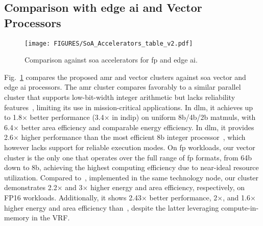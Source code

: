 \subsection{Comparison with edge \gls{ai} and Vector Processors}
\label{sec:soa-acc}
\begin{figure}[t]
    \centering
    \texttt{[image: FIGURES/SoA\_Accelerators\_table\_v2.pdf]}
    \caption{Comparison against \gls{soa} accelerators for \gls{fp} and edge \gls{ai}.}
    \label{fig:soa-accelerators}
\end{figure}

Fig.~\ref{fig:soa-accelerators} compares the proposed \gls{amr} and vector clusters against \gls{soa} vector and edge \gls{ai} processors. The \gls{amr} cluster compares favorably to a similar parallel cluster that supports low-bit-width integer arithmetic but lacks reliability features~\cite{valenteHeterogeneousRISCVBased2024}, limiting its use in mission-critical applications. In \gls{dlm}, it achieves up to 1.8$\times$ better performance (3.4$\times$ in \gls{indip}) on uniform 8b/4b/2b \glspl{matmul}, with  6.4$\times$ better area efficiency and comparable energy efficiency. In \gls{dlm}, it provides 2.6$\times$ higher performance than the most efficient 8b integer processor~\cite{juSystolicNeuralCPU2023}, which however lacks support for reliable execution modes. 
%
On \gls{fp} workloads, our vector cluster is the only one that operates over the full range of \gls{fp} formats, from 64b down to 8b, achieving the highest computing efficiency due to near-ideal resource utilization. Compared to~\cite{schmidtEightCore144GHzRISCV2022}, implemented in the same technology node, our cluster demonstrates 2.2$\times$ and 3$\times$ higher energy and area efficiency, respectively, on FP16 workloads. 
Additionally, it shows 2.43$\times$ better performance, 2$\times$, and 1.6$\times$ higher energy and area efficiency than~\cite{wang306Vecim28913GOPS2024}, despite the latter leveraging compute-in-memory in the VRF.




